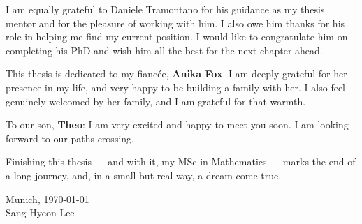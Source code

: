 I am equally grateful to Daniele Tramontano for his guidance as my thesis mentor and for the pleasure of working with him. I also owe him thanks for his role in helping me find my current position. I would like to congratulate him on completing his PhD and wish him all the best for the next chapter ahead.

\medskip

This thesis is dedicated to my fiancée, \textbf{Anika Fox}. I am deeply grateful for her presence in my life, and very happy to be building a family with her. I also feel genuinely welcomed by her family, and I am grateful for that warmth.

To our son, \textbf{Theo}: I am very excited and happy to meet you soon. I am looking forward to our paths crossing.

\medskip

Finishing this thesis — and with it, my MSc in Mathematics — marks the end of a long journey, and, in a small but real way, a dream come true.

\medskip

\begin{flushright}
Munich, \today \\
Sang Hyeon Lee
\end{flushright}